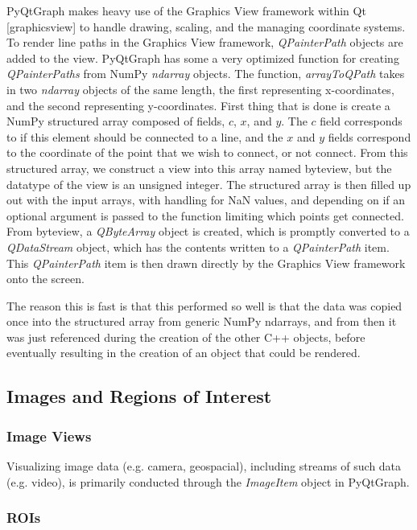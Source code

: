 \documentclass[journal]{vgtc}                %
\begin{document}
PyQtGraph makes heavy use of the Graphics View framework within Qt [graphicsview] to handle drawing, scaling, and the managing coordinate systems.  To render line paths in the Graphics View framework, \emph{QPainterPath} objects are added to the view.  PyQtGraph has some a very optimized function for creating \emph{QPainterPaths} from NumPy \emph{ndarray} objects.  The function, \emph{arrayToQPath} takes in two \emph{ndarray} objects of the same length, the first representing x-coordinates, and the second representing y-coordinates. First thing that is done is create a NumPy structured array composed of fields, $c$, $x$, and $y$.  The $c$ field corresponds to if this element should be connected to a line, and the $x$ and $y$ fields correspond to the coordinate of the point that we wish to connect, or not connect.  From this structured array, we construct a view into this array named byteview, but the datatype of the view is an unsigned integer.  The structured array is then filled up out with the input arrays, with handling for NaN values, and depending on if an optional argument is passed to the function limiting which points get connected.  From byteview, a \emph{QByteArray} object is created, which is promptly converted to a \emph{QDataStream} object, which has the contents written to a \emph{QPainterPath} item.  This \emph{QPainterPath} item is then drawn directly by the Graphics View framework onto the screen.

The reason this is fast is that this performed so well is that the data was copied once into the structured array from generic NumPy ndarrays, and from then it was just referenced during the creation of the other C++ objects, before eventually resulting in the creation of an object that could be rendered.

\subsection{Images and Regions of Interest}



\subsubsection{Image Views}

Visualizing image data (e.g. camera, geospacial), including streams of such data (e.g. video), is primarily conducted through the \emph{ImageItem} object in PyQtGraph.

\subsubsection{ROIs}
\end{document}
